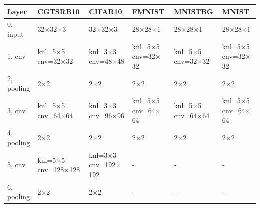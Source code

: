 \documentclass{article}
\begin{document}
\begin{table}
\centering
\begin{tabular}{llllll}
    \toprule
    Layer & CGTSRB10 & CIFAR10 & FMNIST & MNISTBG & MNIST \\
    \midrule
    0, input &
        32$\times$32$\times$3 &
        32$\times$32$\times$3 &
        28$\times$28$\times$1 &
        28$\times$28$\times$1 &
        28$\times$28$\times$1 \\
    \midrule

    1, cnv & 
        \makecell{knl=5$\times$5 \\ cnv=32$\times$32} & 
        \makecell{knl=3$\times$3 \\ cnv=48$\times$48} &
        \makecell{knl=5$\times$5 \\ cnv=32$\times$32} &
        \makecell{knl=5$\times$5 \\ cnv=32$\times$32} &
        \makecell{knl=5$\times$5 \\ cnv=32$\times$32} \\
    \midrule
    2, pooling &
        2$\times$2 &
        2$\times$2 &
        2$\times$2 &
        2$\times$2 &
        2$\times$2 \\
    \midrule

    3, cnv & 
       \makecell{knl=5$\times$5 \\ cnv=64$\times$64} & 
       \makecell{knl=3$\times$3 \\ cnv=96$\times$96} &
       \makecell{knl=5$\times$5 \\ cnv=64$\times$64} &
       \makecell{knl=5$\times$5 \\ cnv=64$\times$64} &
       \makecell{knl=5$\times$5 \\ cnv=64$\times$64} \\
    \midrule

    4, pooling &
        2$\times$2 &
        2$\times$2 &
        2$\times$2 &
        2$\times$2 &
        2$\times$2 \\
    \midrule

    5, cnv & 
       \makecell{knl=5$\times$5 \\ cnv=128$\times$128} & 
       \makecell{knl=3$\times$3 \\ cnv=192$\times$192} &
       - &
       - &
       - \\
    \midrule

    6, pooling &
        2$\times$2 &
        2$\times$2 &
        - &
        - &
        - \\
    \midrule
    

\end{tabular}
\end{table}
\end{document}
